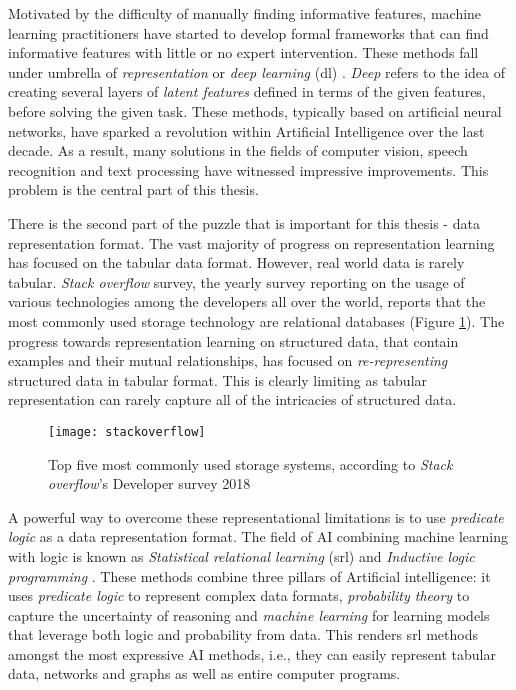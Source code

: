 Motivated by the difficulty of manually finding informative features, machine learning practitioners have started to develop formal frameworks that can find informative features with little or no expert intervention.
These methods fall under umbrella of \textit{representation} or \textit{deep learning} (\gls{dl}) \cite{Goodfellow2016, Bengio:2009}.
\textit{Deep} refers to the idea of creating several layers of \textit{latent features} defined in terms of the given features, before solving the given task.
These methods, typically based on artificial neural networks, have sparked a revolution within Artificial Intelligence over the last decade.
As a result, many solutions in the fields of computer vision, speech recognition and text processing have witnessed impressive improvements.
This problem is the central part of this thesis.



There is the second part of the puzzle that is important for this thesis -  data representation format.
The vast majority of progress on representation learning has focused on the tabular data format.
However, real world data is rarely tabular.
\textit{Stack overflow} survey, the yearly survey reporting on the usage of  various technologies among the developers all over the world, reports that the most commonly used storage technology are relational databases (Figure \ref{fig:stackoverflow}).
The progress towards representation learning on structured data, that contain examples and their mutual relationships, has focused on \textit{re-representing} structured data in tabular format.
This is clearly limiting as tabular representation can rarely capture all of the intricacies of structured data.


\begin{figure}
	\medskip
	\centering
	\texttt{[image: stackoverflow]}
	\caption[Usage of the storage technologies]{Top five most commonly used storage systems, according to \textit{Stack overflow}'s Developer survey 2018\label{fig:stackoverflow}}
\end{figure}


A powerful way to overcome these representational limitations is to use \textit{predicate logic} as a data representation format.
	The field of AI combining machine learning with logic is known as \textit{Statistical relational learning} (\gls{srl}) \cite{GetoorSRL,Raedt:2016:SRA:3027718} and \textit{Inductive logic programming} \cite{LucRLbook}.
These methods combine three pillars of Artificial intelligence: it uses \textit{predicate logic} to represent complex data formats, \textit{probability theory} to capture the uncertainty of reasoning and \textit{machine learning} for learning models that leverage both logic and probability from data.
This renders \gls{srl} methods amongst the most expressive AI methods, i.e., they can easily represent tabular data, networks and graphs as well as entire computer programs.



